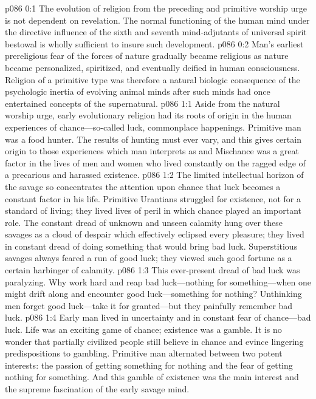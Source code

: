 \author{Brilliant Evening Star}
\vs p086 0:1 The evolution of religion from the preceding and primitive worship urge is not dependent on revelation. The normal functioning of the human mind under the directive influence of the sixth and seventh mind\hyp{}adjutants of universal spirit bestowal is wholly sufficient to insure such development.
\vs p086 0:2 Man’s earliest prereligious fear of the forces of nature gradually became religious as nature became personalized, spiritized, and eventually deified in human consciousness. Religion of a primitive type was therefore a natural biologic consequence of the psychologic inertia of evolving animal minds after such minds had once entertained concepts of the supernatural.
\vs p086 1:1 Aside from the natural worship urge, early evolutionary religion had its roots of origin in the human experiences of chance---so\hyp{}called luck, commonplace happenings. Primitive man was a food hunter. The results of hunting must ever vary, and this gives certain origin to those experiences which man interprets as  and  Mischance was a great factor in the lives of men and women who lived constantly on the ragged edge of a precarious and harassed existence.
\vs p086 1:2 The limited intellectual horizon of the savage so concentrates the attention upon chance that luck becomes a constant factor in his life. Primitive Urantians struggled for existence, not for a standard of living; they lived lives of peril in which chance played an important role. The constant dread of unknown and unseen calamity hung over these savages as a cloud of despair which effectively eclipsed every pleasure; they lived in constant dread of doing something that would bring bad luck. Superstitious savages always feared a run of good luck; they viewed such good fortune as a certain harbinger of calamity.
\vs p086 1:3 This ever\hyp{}present dread of bad luck was paralyzing. Why work hard and reap bad luck---nothing for something---when one might drift along and encounter good luck---something for nothing? Unthinking men forget good luck---take it for granted---but they painfully remember bad luck.
\vs p086 1:4 Early man lived in uncertainty and in constant fear of chance---bad luck. Life was an exciting game of chance; existence was a gamble. It is no wonder that partially civilized people still believe in chance and evince lingering predispositions to gambling. Primitive man alternated between two potent interests: the passion of getting something for nothing and the fear of getting nothing for something. And this gamble of existence was the main interest and the supreme fascination of the early savage mind.
